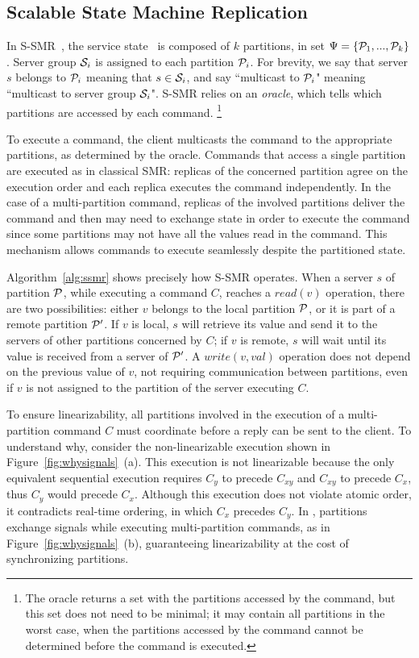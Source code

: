 \subsection{Scalable State Machine Replication}
\label{sec:ssmr}

In S-SMR~\cite{bezerra2014ssmr}, the service state \vvt\ is composed of $k$ partitions, in set $\Psi = \{\mathcal{P}_1, ..., \mathcal{P}_k\}$. Server group $\mathcal{S}_i$ is assigned to each partition $\mathcal{P}_i$. For brevity, we say that server $s$ belongs to $\mathcal{P}_i$ meaning that $s \in \mathcal{S}_i$, and say ``multicast to $\mathcal{P}_i$" meaning ``multicast to server group $\mathcal{S}_i$".
S-SMR relies on an \emph{oracle}, which tells which partitions are accessed by each command.%
\footnote{The oracle returns a set with the partitions accessed by the command, but this set does not need to be minimal; it may contain all partitions in the worst case, when the partitions accessed by the command cannot be determined before the command is executed.}

To execute a command, the client multicasts the command to the appropriate partitions, as determined by the oracle.
Commands that access a single partition are executed as in classical SMR: replicas of the concerned partition agree on the execution order and each replica executes the command independently.
In the case of a multi-partition command, replicas of the involved partitions deliver the command and then may need to exchange state in order to execute the command since some partitions may not have all the values read in the command.
This mechanism allows commands to execute seamlessly despite the partitioned state.



Algorithm~\ref{alg:ssmr} shows precisely how S-SMR operates. When a server $s$ of partition $\mathcal{P}$, while executing a command $C$, reaches a $read(v)$ operation, there are two possibilities:
either $v$ belongs to the local partition $\mathcal{P}$,
or it is part of a remote partition $\mathcal{P}'$. 
If $v$ is local, $s$ will retrieve its value and send it to the servers of other partitions concerned by $C$;
if $v$ is remote, $s$ will wait until its value is received from a server of $\mathcal{P}'$. 
A $write(v, val)$ operation does not depend on the previous value of $v$, not requiring communication between partitions, even if $v$ is not assigned to the partition of the server executing $C$.

\pagebreak

To ensure linearizability, all partitions involved in the execution of a multi-partition command $C$ must coordinate before a reply can be sent to the client.
To understand why, consider the non-linearizable execution shown in Figure~\ref{fig:whysignals}~(a).
This execution is not linearizable because the only equivalent sequential execution requires $C_y$ to precede $C_{xy}$ and $C_{xy}$ to precede $C_x$, thus $C_y$ would precede $C_x$.
Although this execution does not violate atomic order, it contradicts real-time ordering, in which $C_x$ precedes $C_y$.
In \ssmr{}, partitions exchange signals while executing multi-partition commands, as in Figure~\ref{fig:whysignals}~(b), guaranteeing linearizability at the cost of synchronizing partitions.

